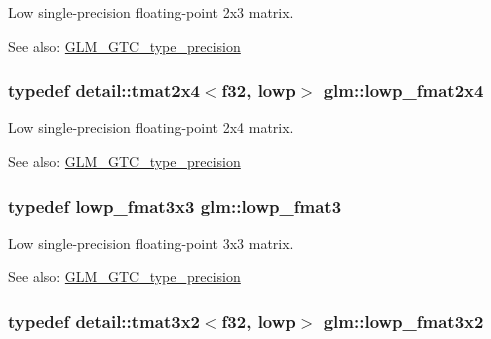 Low single-precision floating-point 2x3 matrix. \begin{Desc}
\item[See also:]\hyperlink{group__gtc__type__precision}{GLM\_\-GTC\_\-type\_\-precision} \end{Desc}
\hypertarget{group__gtc__type__precision_g14b4460b2132fd3db19b53ec6f9353f2}{
\subsubsection[lowp\_\-fmat2x4]{\setlength{\rightskip}{0pt plus 5cm}typedef detail::tmat2x4$<$f32, lowp$>$ {\bf glm::lowp\_\-fmat2x4}}}
\label{group__gtc__type__precision_g14b4460b2132fd3db19b53ec6f9353f2}


Low single-precision floating-point 2x4 matrix. \begin{Desc}
\item[See also:]\hyperlink{group__gtc__type__precision}{GLM\_\-GTC\_\-type\_\-precision} \end{Desc}
\hypertarget{group__gtc__type__precision_g88ae00cab6aae48d56700915c7799973}{
\subsubsection[lowp\_\-fmat3]{\setlength{\rightskip}{0pt plus 5cm}typedef lowp\_\-fmat3x3 {\bf glm::lowp\_\-fmat3}}}
\label{group__gtc__type__precision_g88ae00cab6aae48d56700915c7799973}


Low single-precision floating-point 3x3 matrix. \begin{Desc}
\item[See also:]\hyperlink{group__gtc__type__precision}{GLM\_\-GTC\_\-type\_\-precision} \end{Desc}
\hypertarget{group__gtc__type__precision_g6e03c9a11f7d781af7549ce566844cc6}{
\subsubsection[lowp\_\-fmat3x2]{\setlength{\rightskip}{0pt plus 5cm}typedef detail::tmat3x2$<$f32, lowp$>$ {\bf glm::lowp\_\-fmat3x2}}}
\label{group__gtc__type__precision_g6e03c9a11f7d781af7549ce566844cc6}


